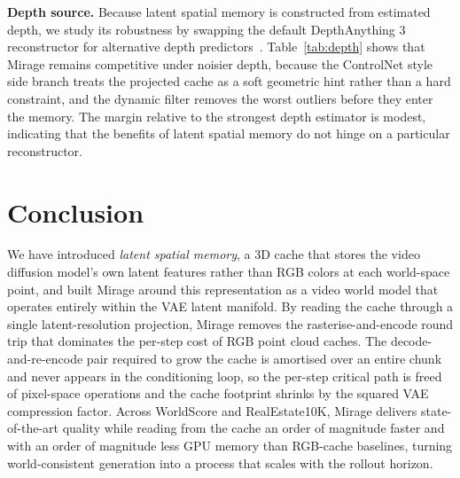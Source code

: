 \documentclass{llmxive}
\providecommand{\method}{Mirage\xspace}
\providecommand{\boldstart}[1]{\vspace{0.1in}\noindent\textbf{#1}}
\begin{document}
\boldstart{Depth source.}
Because latent spatial memory is constructed from estimated depth, we study its robustness by swapping the default DepthAnything 3~\cite{lin2025depth} reconstructor for alternative depth predictors~\cite{keetha2025mapanything,piccinelli2024unidepth}. Table~\ref{tab:depth} shows that \method{} remains competitive under noisier depth, because the ControlNet style side branch treats the projected cache as a soft geometric hint rather than a hard constraint, and the dynamic filter removes the worst outliers before they enter the memory. The margin relative to the strongest depth estimator is modest, indicating that the benefits of latent spatial memory do not hinge on a particular reconstructor.
\begin{table}
    \centering
    \label{tab:depth}
\caption{\textbf{Sensitivity to the depth source.} We swap DepthAnything 3 for alternative depth predictors while keeping all other components of \method{} fixed.}
\end{table}

\section{Conclusion}
\label{sec:conclusion}

We have introduced \emph{latent spatial memory}, a 3D cache that stores the video diffusion model's own latent features rather than RGB colors at each world-space point, and built \method{} around this representation as a video world model that operates entirely within the VAE latent manifold.
By reading the cache through a single latent-resolution projection, \method{} removes the rasterise-and-encode round trip that dominates the per-step cost of RGB point cloud caches.
The decode-and-re-encode pair required to grow the cache is amortised over an entire chunk and never appears in the conditioning loop, so the per-step critical path is freed of pixel-space operations and the cache footprint shrinks by the squared VAE compression factor.
Across WorldScore and RealEstate10K, \method{} delivers state-of-the-art quality while reading from the cache an order of magnitude faster and with an order of magnitude less GPU memory than RGB-cache baselines, turning world-consistent generation into a process that scales with the rollout horizon.
\end{document}

